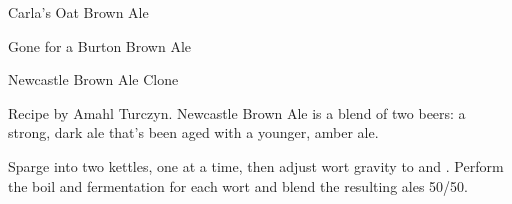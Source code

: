 \begin{recipe}{Carla's Oat Brown Ale}
\begin{recipe}{Gone for a Burton Brown Ale}
\begin{ingredientsblock}
\end{ingredientsblock}

\end{recipe}

\begin{recipe}{Newcastle Brown Ale Clone}

\begin{aboutblock}
Recipe by Amahl Turczyn. Newcastle Brown Ale is a blend of two beers: a strong,
dark ale that's been aged with a younger, amber ale.
\end{aboutblock}


\begin{methodandtiming}

\begin{mashsteps}
\end{mashsteps}

\begin{fermentationsteps}
\end{fermentationsteps}

\begin{directions}
Sparge into two kettles, one at a time, then adjust wort gravity to 
and . Perform the boil and fermentation for each wort and blend the
resulting ales 50/50.
\end{directions}

\end{methodandtiming}

\recipebreak

\begin{ingredientsblock}

\begin{malts}
\end{malts}

\begin{hops}
\end{hops}


\end{ingredientsblock}
\end{recipe}
\end{recipe}
